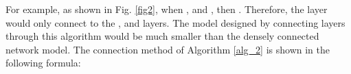 \documentclass[conference]{IEEEtran}
\begin{document}
\begin{algorithm}
\caption{}
\label{alg_2}
\begin{algorithmic}
\ENSURE {}
\STATE {}
\STATE{)}
\ENDFOR
\ENDFOR
{}
\ENDFOR
\end{algorithmic}
\end{algorithm}

For example, as shown in Fig. \ref{fig2}, when , and , then . Therefore, the  layer would only connect to the ,  and  layers. The model designed by connecting layers through this algorithm would be much smaller than the densely connected network model. The connection method of Algorithm \ref{alg_2} is shown in the following formula:
\end{document}
